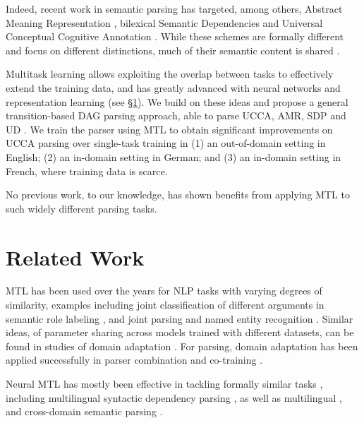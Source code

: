 \documentclass[11pt,a4paper]{article}
\begin{document}
Indeed, recent work in semantic parsing has targeted, among others,
Abstract Meaning Representation \cite[AMR;][]{banarescu2013abstract},
bilexical Semantic Dependencies \cite[SDP;][]{oepen2016towards}
and Universal Conceptual Cognitive Annotation \cite[UCCA;][]{abend2013universal}.
While these schemes are formally different and focus on different distinctions,
much of their semantic content is shared \cite{abend2017state}.

Multitask learning \cite[MTL; ][]{caruana1998multitask} allows exploiting the overlap between tasks
to effectively extend the training data, 
and has greatly advanced with neural networks and representation learning
(see \S\ref{sec:related_work}).
We build on these ideas and propose a general transition-based DAG parsing approach,
able to parse UCCA, AMR, SDP and UD \cite{nivre2016universal}.
We train the parser using MTL to obtain significant improvements
on UCCA parsing over single-task training in
(1) an out-of-domain setting in English; 
(2) an in-domain setting in German; and
(3) an in-domain setting in French, where training data is
scarce.

No previous work, to our knowledge, has shown benefits 
from applying MTL to such widely different parsing tasks.

\section{Related Work}\label{sec:related_work}

MTL has been used over the years for NLP tasks with varying degrees of similarity,
examples including joint classification of different arguments in 
semantic role labeling \cite{toutanova2005joint},
and joint parsing and named entity recognition \cite{Finkel2009JointPA}.
Similar ideas, of parameter sharing across models trained with different datasets,
can be found in studies of domain adaptation \cite{W06-1615,P07-1033,K17-1040}.
For parsing, domain adaptation has been applied successfully in
parser combination and co-training \cite{mcclosky2010automatic,baucom2013domain}.

Neural MTL has mostly been effective in tackling formally similar
tasks \cite{P16-2038},
including
multilingual syntactic dependency parsing \cite{Q16-1031,guo2016exploiting},
as well as multilingual \cite{duong2017multilingual},
and cross-domain semantic parsing \cite{herzig-berant:2017:Short,W17-2607}.
\end{document}

